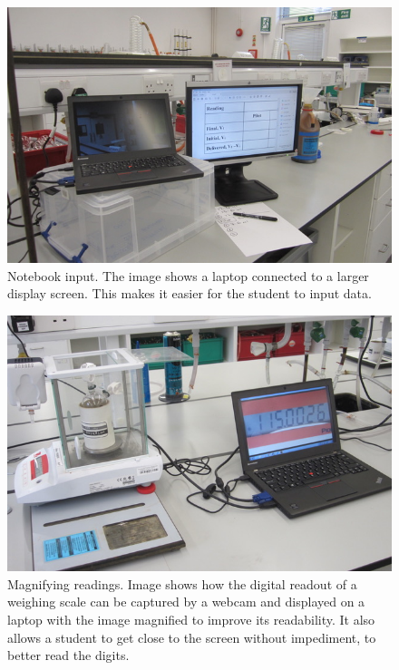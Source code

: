 \documentclass[11.5pt]{sig-alternate} %
\begin{document}
\begin{large}
\begin{figure}[htbp]
    \centering
    \includegraphics[width=\columnwidth]{images/fig11.jpeg}
    \caption{Notebook input. The image shows a laptop connected to a larger display screen. This makes it easier for the student to input data.}
    \label{Figure 11}
\end{figure}

\begin{figure}[htbp]
    \centering
    \includegraphics[width=\columnwidth]{images/fig12.jpeg}
    \caption{Magnifying readings. Image shows how the digital readout of a weighing scale can be captured by a webcam and displayed on a laptop with the image magnified to improve its readability. It also allows a student to get close to the screen without impediment, to better read the digits.}
    \label{Figure 12}
\end{figure}


\end{large}
\end{document}
